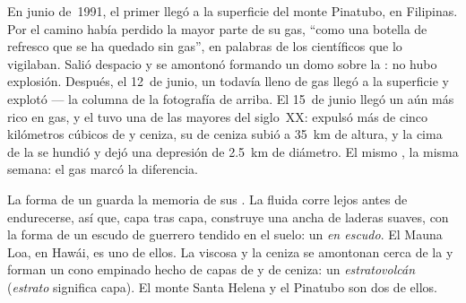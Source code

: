 \begin{example}\label{ex:g7:volcanoes:pinatubo}
En junio de~1991, el primer  llegó a la superficie del monte Pinatubo,
en Filipinas. Por el camino había perdido la mayor parte de su gas, ``como
una botella de refresco que se ha quedado sin gas'', en palabras de los
científicos que lo vigilaban. Salió despacio y se amontonó formando un
domo sobre la : no hubo explosión. Después, el 12~de junio, un 
todavía lleno de gas llegó a la superficie y explotó --- la columna de la
fotografía de arriba. El 15~de junio llegó un  aún más rico en gas, y
el  tuvo una de las mayores  del siglo~XX: expulsó más de
cinco kilómetros cúbicos de  y ceniza, su  de ceniza subió a
\qty{35}{km} de altura, y la cima de la  se hundió y dejó una
depresión de \qty{2.5}{km} de diámetro. El mismo , la misma semana:
el gas marcó la diferencia.
\end{example}

La forma de un  guarda la memoria de sus . La  fluida
corre lejos antes de endurecerse, así que, capa tras capa, construye una
 ancha de laderas suaves, con la forma de un escudo de guerrero
tendido en el suelo: un \emph{ en escudo}. El Mauna Loa, en Hawái, es
uno de ellos. La  viscosa y la ceniza se amontonan cerca de la  y
forman un cono empinado hecho de capas de  y de ceniza: un
\emph{estratovolcán} (\emph{estrato} significa capa). El monte Santa Helena
y el Pinatubo son dos de ellos.

